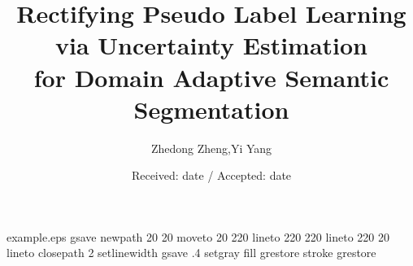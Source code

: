 \begin{filecontents*}{example.eps}
gsave
newpath
  20 20 moveto
  20 220 lineto
  220 220 lineto
  220 20 lineto
closepath
2 setlinewidth
gsave
  .4 setgray fill
grestore
stroke
grestore
\end{filecontents*}
\RequirePackage{fix-cm}
\documentclass[twocolumn]{svjour3}          \smartqed  \usepackage{graphicx}

\usepackage{times}
\usepackage{epsfig}
\usepackage{multirow}

\usepackage{cite}
\usepackage{algorithm, algpseudocode}
\usepackage{caption}
\usepackage{comment}
\usepackage{amsmath}
\usepackage{amssymb}
\usepackage[dvipsnames,svgnames,x11names]{xcolor}
\usepackage[pagebackref=false,breaklinks=true,letterpaper=true,colorlinks,citecolor=citecolor,bookmarks=false]{hyperref}
\newcommand{\tabincell}[2]{\begin{tabular}{@{}#1@{}}#2\end{tabular}}
\usepackage{pifont}
\usepackage{color}
\newcommand{\cmark}{\ding{51}}\newcommand{\xmark}{\ding{55}}

\usepackage{amsmath}
\DeclareMathOperator*{\argmax}{arg\,max}
\DeclareMathOperator*{\argmin}{arg\,min}
\DeclareMathOperator*{\E}{\mathbb{E}}
\def\eg{\emph{e.g.}} 
\def\ie{\emph{i.e.}} 
\def\etal{\emph{et~al.}} 

\newcommand{\zznote}[1]{\textcolor{black}{#1}}

\newlength\savewidth\newcommand\shline{\noalign{\global\savewidth\arrayrulewidth
  \global\arrayrulewidth 1pt}\hline\noalign{\global\arrayrulewidth\savewidth}}
  


\title{Rectifying Pseudo Label Learning via Uncertainty Estimation \\for 
Domain Adaptive Semantic Segmentation 
}

\author{
  Zhedong Zheng,\quad Yi Yang
}








\date{Received: date / Accepted: date}



\maketitle


